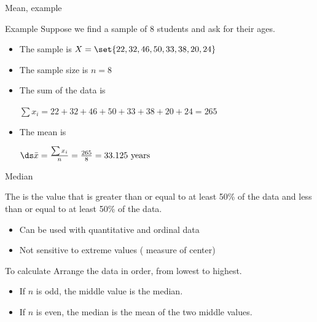 \documentclass[xcolor=table, handout]{beamer}
\begin{document}
\begin{frame}{Mean, example}
\begin{exampleblock}{Example}
Suppose we find a sample of 8 students and ask for their ages. 

\begin{itemize}
\item The sample is $X = \set{22, 32, 46, 50, 33, 38, 20, 24}$
\pause\item The sample size is $n=8$
\pause
\item The sum of the data is\\
\smallskip
{\centering
$\sum x_i = 22 + 32 + 46 + 50 + 33 +  38 + 20 + 24 = 265$
\par}
\pause
\item The mean is\\
\smallskip
{\centering
$\ds \bar x = \frac {\sum x_i}{n} = \frac {265} 8 = 33.125 \text{ years}$
\par}
\end{itemize}
\smallskip
\end{exampleblock}
\end{frame}

\begin{frame}{Median}
\begin{block}{}
The  is the value that is greater than or equal to at least 50\% of the data and less than or equal to at least 50\% of the data.
\begin{itemize}
\item Can be used with quantitative and ordinal data
\item Not sensitive to extreme values ( measure of center)
\end{itemize}
\end{block}

\pause
\begin{block}{To calculate}
Arrange the data in order, from lowest to highest.
\begin{itemize}
\item If $n$ is odd, the middle value is the median.
\item If $n$ is even, the median is the mean of the two middle values.
\end{itemize}
\end{block}
\end{frame}
\end{document}
